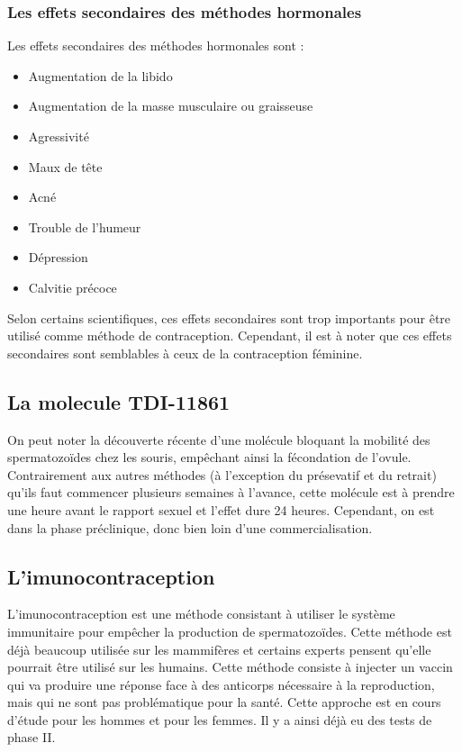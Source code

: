 \documentclass[12pt,a4paper]{report}
\begin{document}
\subsubsection{Les effets secondaires des méthodes hormonales} \label{effets-secondaires-methodes-hormonales}

Les effets secondaires des méthodes hormonales sont :
\begin{itemize}
    \item Augmentation de la libido
    \item Augmentation de la masse musculaire ou graisseuse
    \item Agressivité
    \item Maux de tête
    \item Acné
    \item Trouble de l'humeur
    \item Dépression
    \item Calvitie précoce \cites{guillaumedaudinContraceptesEnqueteDernier2022}{anne-sophiedelcourHommeSousPilule}{ContraceptionHormonaleMasculine2016}
\end{itemize}

Selon certains scientifiques, ces effets secondaires sont trop importants pour être utilisé comme méthode de contraception. Cependant, il est à noter que ces effets secondaires sont semblables à ceux de la contraception féminine. \cite{ContraceptionHormonaleMasculine2016}

\subsection{La molecule TDI-11861}

On peut noter la découverte récente d'une molécule bloquant la mobilité des spermatozoïdes chez les souris, empêchant ainsi la fécondation de l'ovule.
Contrairement aux autres méthodes (à l'exception du présevatif et du retrait) qu'ils faut commencer plusieurs semaines à l'avance, cette molécule est à prendre une heure avant le rapport sexuel et l'effet dure 24 heures. \cite{balbachOndemandMaleContraception2023}
Cependant, on est dans la phase préclinique, donc bien loin d'une commercialisation. \cite{DeveloppementMedicamentInserm}

\subsection{L'imunocontraception}

L'imunocontraception est une méthode consistant à utiliser le système immunitaire pour empêcher la production de spermatozoïdes.
Cette méthode est déjà beaucoup utilisée sur les mammifères et certains experts pensent qu'elle pourrait être utilisé sur les humains. \cite{ImmunocontraceptionWikipedia}
Cette méthode consiste à injecter un vaccin qui va produire une réponse face à des anticorps nécessaire à la reproduction, mais qui ne sont pas problématique pour la santé.
Cette approche est en cours d'étude pour les hommes et pour les femmes. Il y a ainsi déjà eu des tests de phase II. \cite{mclaughlinThereRoleImmunocontraception2011}
\end{document}
